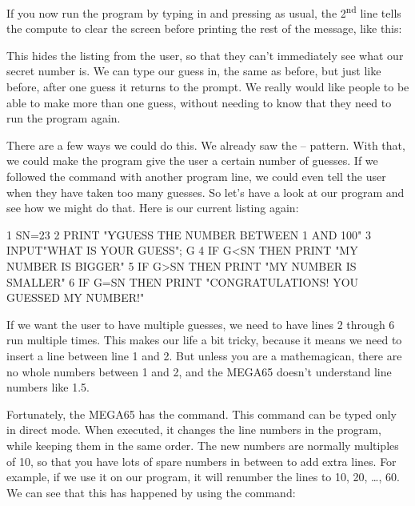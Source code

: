 
\needspace{2cm}
If you now run the program by typing in  and pressing
 as usual, the 2\textsuperscript{nd} line tells
the compute to clear the screen before printing the rest of the message, like this:


This hides the listing from the user, so that they can't immediately see
what our secret number is. We can type our guess in, the same as before,
but just like before, after one guess it returns to the 
prompt.  We really would like people to be able to make more than one
guess, without needing to know that they need to run the program
again.

\needspace{3cm}
There are a few ways we could do this. We already saw the  --
 pattern. With that, we could make the program give the
user a certain number of guesses.  If we followed the 
command with another program line, we could even tell the user when
they have taken too many guesses.  So let's have a look at our
program and see how we might do that.  Here is our current listing again:

\begin{screenoutput}
1 SN=23
2 PRINT "ƳGUESS THE NUMBER BETWEEN 1 AND 100"
3 INPUT"WHAT IS YOUR GUESS"; G
4 IF G<SN THEN PRINT "MY NUMBER IS BIGGER"
5 IF G>SN THEN PRINT "MY NUMBER IS SMALLER"
6 IF G=SN THEN PRINT "CONGRATULATIONS! YOU GUESSED MY NUMBER!"
\end{screenoutput}

If we want the user to have multiple guesses, we need to have lines 2
through 6 run multiple times.  This makes our life a bit tricky,
because it means we need to insert a line between line 1 and 2. But
unless you are a mathemagican, there are no whole numbers between 1
and 2, and the MEGA65 doesn't understand line numbers like 1.5.

\needspace{4cm}
Fortunately, the MEGA65 has the
command.  This command can be typed only in direct mode. When
executed, it changes the line numbers in the program, while keeping
them in the same order.  The new numbers are normally multiples of 10,
so that you have lots of spare numbers in between to add extra lines.
For example, if we use it on our program, it will renumber the lines
to 10, 20, \ldots, 60. We can see that this has happened by using the
 command:


